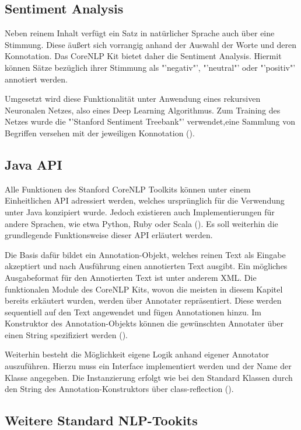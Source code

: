 \subsection{Sentiment Analysis}
\label{subsec:sentiment}
Neben reinem Inhalt verfügt ein Satz in natürlicher Sprache auch über eine Stimmung. Diese äußert sich vorrangig anhand der Auswahl der Worte und deren Konnotation. Das CoreNLP Kit bietet daher die Sentiment Analysis. Hiermit können Sätze bezüglich ihrer Stimmung als "'negativ"', "'neutral"' oder "'positiv"' annotiert werden.\par
Umgesetzt wird diese Funktionalität unter Anwendung eines rekursiven Neuronalen Netzes, also eines Deep Learning Algorithmus. Zum Training des Netzes wurde die "'Stanford Sentiment Treebank"' verwendet,eine Sammlung von Begriffen versehen mit der jeweiligen Konnotation (\cite[vgl.][1]{SOCHERSENTIMENT}).

\subsection{Java API}
\label{subsec:corenlpjava}
Alle Funktionen des Stanford CoreNLP Toolkits können unter einem Einheitlichen \ac{API} adressiert werden, welches ursprünglich für die Verwendung unter Java konzipiert wurde. Jedoch existieren auch Implementierungen für andere Sprachen, wie etwa Python, Ruby oder Scala (\cite[vgl.][3]{STANFORDNLP}). Es soll weiterhin die grundlegende Funktionsweise dieser \ac{API} erläutert werden.\par
Die Basis dafür bildet ein Annotation-Objekt, welches reinen Text als Eingabe akzeptiert und nach Ausführung einen annotierten Text ausgibt. Ein mögliches Ausgabeformat für den Annotierten Text ist unter anderem XML. Die funktionalen Module des CoreNLP Kits, wovon die meisten in diesem Kapitel bereits erkäutert wurden, werden über Annotater repräsentiert. Diese werden sequentiell auf den Text angewendet und fügen Annotationen hinzu. Im Konstruktor des Annotation-Objekts können die gewünschten Annotater über einen String spezifiziert werden (\cite[vgl.][1]{STANFORDNLP}).\par
Weiterhin besteht die Möglichkeit eigene Logik anhand eigener Annotator auszuführen. Hierzu muss ein Interface implementiert werden und der Name der Klasse angegeben. Die Instanzierung erfolgt wie bei den Standard Klassen durch den String des Annotation-Konstruktors über class-reflection (\cite[vgl.][4]{STANFORDNLP}).

\subsection{Weitere Standard NLP-Tookits}

